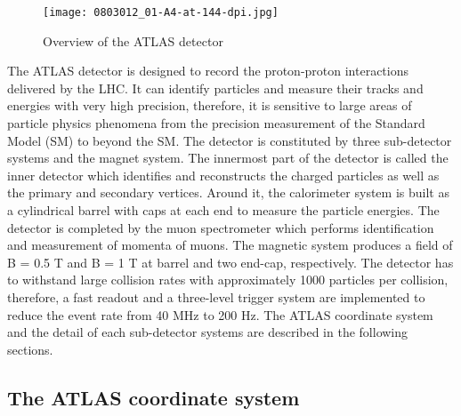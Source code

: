\begin{figure}[htbp]
\begin{center}
\texttt{[image: 0803012\_01-A4-at-144-dpi.jpg]}
\caption{Overview of the ATLAS detector}
\label{fig:ATLAS_detector}
\end{center}
\end{figure}

The ATLAS detector is designed to record the proton-proton interactions delivered by the LHC.
It can identify particles and measure their tracks and energies with very high precision, therefore, it is sensitive to large areas of particle physics phenomena from the precision measurement of the Standard Model (SM) to beyond the SM.
The detector is constituted by three sub-detector systems and the magnet system.
The innermost part of the detector is called the inner detector which identifies and reconstructs the charged particles as well as the primary and secondary vertices.
Around it, the calorimeter system is built as a cylindrical barrel with caps at each end to measure the particle energies.
The detector is completed by the muon spectrometer which performs identification and measurement of momenta of muons.
The magnetic system produces a field of B = 0.5 T and B = 1 T at barrel and two end-cap, respectively.
The detector has to withstand large collision rates with approximately 1000 particles per collision, therefore, a fast readout and a three-level trigger system are implemented to reduce the event rate from 40 MHz to 200 Hz.
The ATLAS coordinate system and the detail of each sub-detector systems are described in the following sections.

\subsection{The ATLAS coordinate system}

